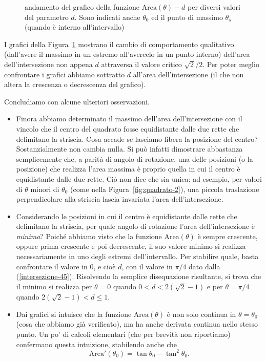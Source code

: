 {\begin{figure}[htbp]
	\hfill
	\hfill
	\hfill
	\hfill\mbox{}\vspace{-4ex}
	\caption{andamento del grafico della funzione
	$\mbox{Area}(\theta)-d$ per diversi valori del parametro $d$.
	Sono indicati anche $\theta_{0}$ ed il punto di massimo $\theta_{s}$
	(quando \`{e} interno all'intervallo)}
	\label{fig:grafici-area}
\end{figure}

I grafici della Figura~\ref{fig:grafici-area} mostrano il cambio di
comportamento qualitativo (dall'avere il massimo in un estremo
all'avercelo in un punto interno) dell'area dell'intersezione non
appena $d$ attraversa il valore critico $\sqrt{2}/2$.  Per poter
meglio confrontare i grafici abbiamo sottratto $d$ all'area
dell'intersezione (il che non altera la crescenza o decrescenza del 
grafico).

Concludiamo con alcune ulteriori osservazioni.
\begin{itemize}
	\item Finora abbiamo determinato il massimo dell'area
	dell'intersezione con il vincolo che il centro del quadrato fosse
	equidistante dalle due rette che delimitano la striscia.  Cosa
	accade se lasciamo libera la posizione del centro?
	Sostanzialmente non cambia nulla.  Si pu\`{o} infatti dimostrare
	abbastanza semplicemente che, a parit\`{a} di angolo di rotazione,
	una delle posizioni (o la posizione) che realizza l'area massima
	\`{e} proprio quella in cui il centro \`{e} equidistante dalle due
	rette.  Ci\`{o} non dice che sia unica: ad esempio, per valori di
	$\theta$ minori di $\theta_{0}$ (come nella
	Figura~\ref{fig:quadrato-2}), una piccola traslazione
	perpendicolare alla striscia lascia invariata l'area
	dell'intersezione.

	\item Considerando le posizioni in cui il centro \`{e}
	equidistante dalle rette che delimitano la striscia, per quale
	angolo di rotazione l'area dell'intersezione \`{e} \emph{minima}?
	Poich\'{e} abbiamo visto che la funzione $\mbox{Area}(\theta)$
	\`{e} sempre crescente, oppure prima crescente e poi decrescente,
	il suo valore minimo si realizza necessariamente in uno degli
	estremi dell'intervallo.  Per stabilire quale, basta confrontare
	il valore in 0, e cio\`{e} $d$, con il valore in $\pi/4$ dato
	dalla (\ref{intersezione-45}).  Risolvendo la semplice
	disequazione risultante, si trova che il minimo si realizza per
	$\theta=0$ quando $0<d<2(\sqrt{2}-1)$ e per $\theta=\pi/4$ quando
	$2(\sqrt{2}-1)<d\leq 1$.

	\item Dai grafici si intuisce che la funzione
	$\mbox{Area}(\theta)$ \`{e} non solo continua in
	$\theta=\theta_{0}$ (cosa che abbiamo gi\`{a} verificato), ma ha
	anche derivata continua nello stesso punto.  Un po' di calcoli
	elementari (che per brevit\`{a} non riportiamo) confermano questa
	intuizione, stabilendo anche che
	$$\mbox{Area}'(\theta_{0})=\tan\theta_{0}-\tan^{2}\theta_{0}.$$ 
\end{itemize} 


}

\renewcommand{\Commenti}{
}